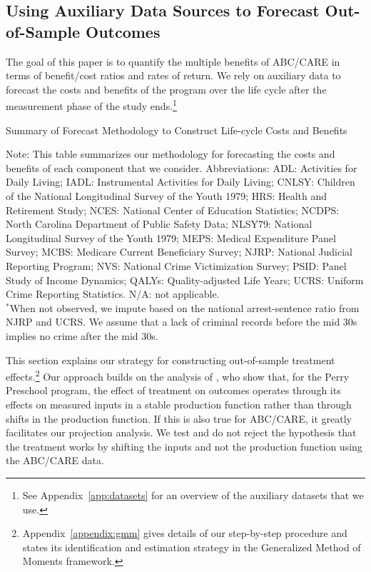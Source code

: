 \subsection{Using Auxiliary Data Sources to Forecast Out-of-Sample Outcomes}\label{sec:usingaux}

The goal of this paper is to quantify the multiple benefits of ABC/CARE in terms of benefit/cost ratios and rates of return. We rely on auxiliary data to forecast the costs and benefits of the program over the life cycle after the measurement phase of the study ends.\footnote{See Appendix~\ref{app:datasets} for an overview of the auxiliary datasets that we use.}

\begin{table}
\begin{threeparttable}
\caption{Summary of Forecast Methodology to Construct Life-cycle Costs and Benefits} \label{table:sources}
\tiny

\begin{tablenotes}
\scriptsize
Note: This table summarizes our methodology for forecasting the costs and benefits of each component that we consider. Abbreviations: ADL: Activities for Daily Living; IADL: Instrumental Activities for Daily Living; CNLSY: Children of the National Longitudinal Survey of the Youth 1979;  HRS: Health and Retirement Study; NCES: National Center of Education Statistics; NCDPS: North Carolina Department of Public Safety Data; NLSY79: National Longitudinal Survey of the Youth 1979; MEPS: Medical Expenditure Panel Survey; MCBS: Medicare Current Beneficiary Survey; NJRP: National Judicial Reporting Program; NVS: National Crime Victimization Survey; PSID: Panel Study of Income Dynamics; QALYs: Quality-adjusted Life Years; UCRS: Uniform Crime Reporting Statistics. N/A: not applicable. \\
$^*$When not observed, we impute based on the national arrest-sentence ratio  from NJRP and UCRS. We assume that a lack of criminal records before the mid 30s implies no crime after the mid 30s. \\
\end{tablenotes}
\end{threeparttable}
\end{table}

This section explains our strategy for constructing out-of-sample treatment effects.\footnote{ Appendix~\ref{appendix:gmm} gives details of our step-by-step procedure and states its identification and estimation strategy in the Generalized Method of Moments framework.} Our approach builds on the analysis of \citet{Heckman_Pinto_etal_2013_PerryFactor}, who show that, for the Perry Preschool program, the effect of treatment on outcomes operates through its effects on measured inputs in a stable production function rather than through shifts in the production function. If this is also true for ABC/CARE, it greatly facilitates our projection analysis. We test and do not reject the hypothesis that the treatment works by shifting the inputs and not the production function using the ABC/CARE data.

